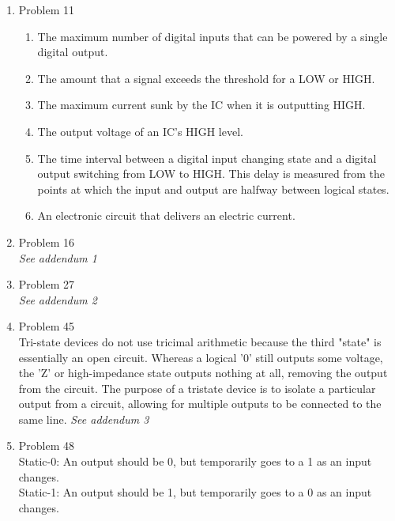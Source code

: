 \begin{enumerate}[leftmargin=2cm,labelsep=.5cm,label=\bf\arabic*.]

\item Problem 11
\begin{enumerate}
  \item The maximum number of digital inputs that can be powered by a single digital output.
  \item The amount that a signal exceeds the threshold for a LOW or HIGH. 
  \item The maximum current sunk by the IC when it is outputting HIGH.
  \item The output voltage of an IC's HIGH level.
  \item The time interval between a digital input changing state and a digital output switching from LOW to HIGH. This delay is measured from the points at which the input and output are halfway between logical states.
  \item An electronic circuit that delivers an electric current. 
\end{enumerate}

\item Problem 16 \\
\emph{See addendum 1}

\item Problem 27 \\
\emph{See addendum 2}

\item Problem 45 \\
Tri-state devices do not use tricimal arithmetic because the third "state" is essentially an open circuit. Whereas a logical '0' still outputs some voltage, the 'Z' or high-impedance state outputs nothing at all, removing the output from the circuit. The purpose of a tristate device is to isolate a particular output from a circuit, allowing for multiple outputs to be connected to the same line.
\emph{See addendum 3}

\item Problem 48 \\
Static-0: An output should be 0, but temporarily goes to a 1 as an input changes. \\
Static-1: An output should be 1, but temporarily goes to a 0 as an input changes.

\end{enumerate}
